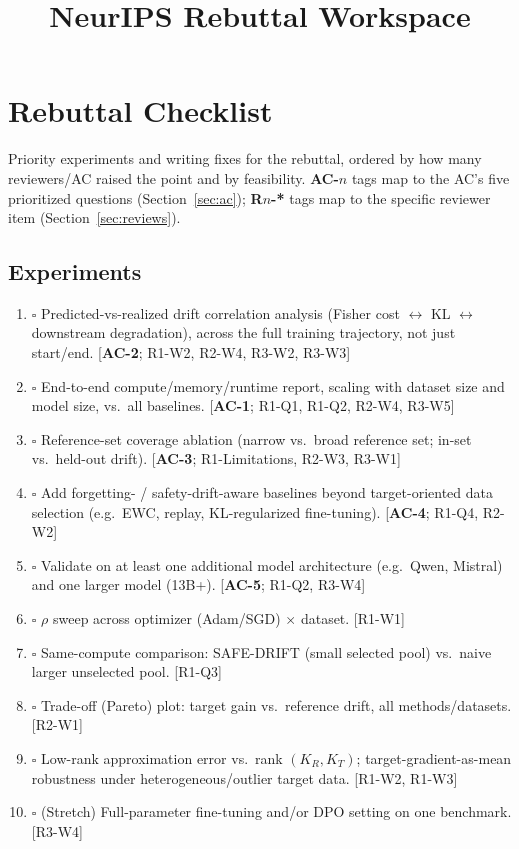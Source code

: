 \documentclass{article}
\title{NeurIPS Rebuttal Workspace}
\date{}
\begin{document}
\maketitle
\tableofcontents

\section{Rebuttal Checklist}
\label{sec:checklist}

Priority experiments and writing fixes for the rebuttal, ordered by how many
reviewers/AC raised the point and by feasibility. \textbf{AC-$n$} tags map to the
AC's five prioritized questions (Section~\ref{sec:ac}); \textbf{R$n$-*} tags map to
the specific reviewer item (Section~\ref{sec:reviews}).

\subsection*{Experiments}
\begin{enumerate}
    \item $\square$ Predicted-vs-realized drift correlation analysis (Fisher cost $\leftrightarrow$ KL $\leftrightarrow$ downstream degradation), across the full training trajectory, not just start/end. [\textbf{AC-2}; R1-W2, R2-W4, R3-W2, R3-W3]
    \item $\square$ End-to-end compute/memory/runtime report, scaling with dataset size and model size, vs.\ all baselines. [\textbf{AC-1}; R1-Q1, R1-Q2, R2-W4, R3-W5]
    \item $\square$ Reference-set coverage ablation (narrow vs.\ broad reference set; in-set vs.\ held-out drift). [\textbf{AC-3}; R1-Limitations, R2-W3, R3-W1]
    \item $\square$ Add forgetting- / safety-drift-aware baselines beyond target-oriented data selection (e.g.\ EWC, replay, KL-regularized fine-tuning). [\textbf{AC-4}; R1-Q4, R2-W2]
    \item $\square$ Validate on at least one additional model architecture (e.g.\ Qwen, Mistral) and one larger model (13B+). [\textbf{AC-5}; R1-Q2, R3-W4]
    \item $\square$ $\rho$ sweep across optimizer (Adam/SGD) $\times$ dataset. [R1-W1]
    \item $\square$ Same-compute comparison: SAFE-DRIFT (small selected pool) vs.\ naive larger unselected pool. [R1-Q3]
    \item $\square$ Trade-off (Pareto) plot: target gain vs.\ reference drift, all methods/datasets. [R2-W1]
    \item $\square$ Low-rank approximation error vs.\ rank $(K_R,K_T)$; target-gradient-as-mean robustness under heterogeneous/outlier target data. [R1-W2, R1-W3]
    \item $\square$ (Stretch) Full-parameter fine-tuning and/or DPO setting on one benchmark. [R3-W4]
\end{enumerate}
\end{document}
